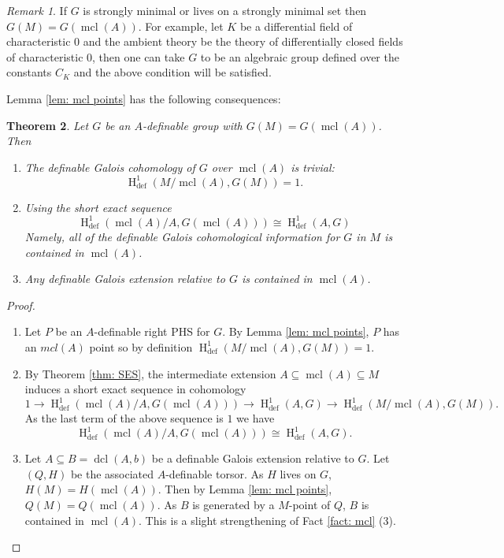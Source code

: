 \documentclass{amsart}
\newtheorem{theorem}{Theorem}[section]
\theoremstyle{definition}
\theoremstyle{remark}
\newtheorem{remark}[theorem]{Remark}
\numberwithin{equation}{section}
\def \defin {\operatorname{def}}
\def \HH {\operatorname{H}}
\def \mcl {\operatorname{mcl}}
\def \dcl {\operatorname{dcl}}
\begin{document}
\begin{remark}
    If $G$ is strongly minimal or lives on a strongly minimal set then $G(M) = G(\mcl(A))$. For example, let $K$ be a differential field of characteristic $0$ and the ambient theory be the theory of differentially closed fields of characteristic $0$, then one can take $G$ to be an algebraic group defined over the constants $C_K$ and the above condition will be satisfied.
\end{remark}

Lemma \ref{lem: mcl points} has the following consequences:

\begin{theorem}\label{thm: mcl points}
    Let $G$ be an $A$-definable group with $G(M) = G(\mcl(A))$. Then
    \begin{enumerate}
        \item The definable Galois cohomology of $G$ over $\mcl(A)$ is trivial: $$\HH^1_{\defin}(M/\mcl(A),G(M)) = 1.$$
        \item Using the short exact sequence $$\HH^1_{\defin}(\mcl(A)/A,G(\mcl(A))) \cong \HH^1_{\defin}(A,G)$$ Namely, all of the definable Galois cohomological information for $G$ in $M$ is contained in $\mcl(A)$.
        \item Any definable Galois extension relative to $G$ is contained in $\mcl(A)$.
    \end{enumerate}
\end{theorem}

\begin{proof}
    \begin{enumerate}
        \item Let $P$ be an $A$-definable right PHS for $G$. By Lemma \ref{lem: mcl points}, $P$ has an $mcl(A)$ point so by definition $\HH^1_{\defin}(M/\mcl(A),G(M)) = 1$.
        \item By Theorem \ref{thm: SES}, the intermediate extension $A \subseteq \mcl(A) \subseteq M$ induces a short exact sequence in cohomology $$1 \to \HH^1_{\defin}(\mcl(A)/A,  G(\mcl(A))) \to \HH^1_{\defin}(A, G) \to \HH^1_{\defin}(M/\mcl(A), G(M)).$$ As the last term of the above sequence is $1$ we have $$\HH^1_{\defin}(\mcl(A)/A,G(\mcl(A))) \cong \HH^1_{\defin}(A,G).$$
        \item Let $A \subseteq B = \dcl(A,b)$ be a definable Galois extension relative to $G$. Let $(Q,H)$ be the associated $A$-definable torsor. As $H$ lives on $G$, $H(M) = H(\mcl(A))$. Then by Lemma \ref{lem: mcl points}, $Q(M) = Q(\mcl(A))$. As $B$ is generated by a $M$-point of $Q$, $B$ is contained in $\mcl(A)$. This is a slight strengthening of Fact \ref{fact: mcl} (3).
    \end{enumerate}
\end{proof}
\end{document}
